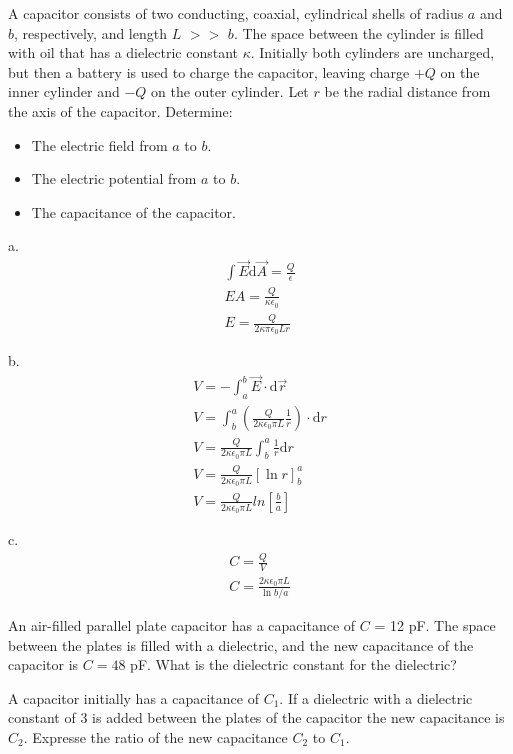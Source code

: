 \documentclass[../em.tex]{subfiles}
\begin{document}
\pagebreak
\begin{example}
    A capacitor consists of two conducting, coaxial, cylindrical shells of radius $a$ and $b$, respectively,
    and length $L$ $>>$ $b$. The space between the cylinder is filled with oil that has a dielectric constant $\kappa$.
    Initially both cylinders are uncharged, but then a battery is used to charge the capacitor, leaving charge $+Q$ 
    on the inner cylinder and $-Q$ on the outer cylinder. Let $r$ be the radial distance from the axis of the capacitor.
    Determine:
    \begin{itemize}
        \item The electric field from $a$ to $b$.
        \item The electric potential from $a$ to $b$.
        \item The capacitance of the capacitor.
    \end{itemize}

    a.
    \begin{align*}
        \int \vec{E}\mathrm{d}\vec{A}=\frac{Q}{\epsilon}\\ 
        EA = \frac{Q}{\kappa\epsilon_0}\\
        E = \frac{Q}{2\kappa \pi\epsilon_0 L r}
    \end{align*} 

    b.
    \begin{align*}
        V = -\int_a^b \vec{E}\cdot\mathrm{d}\vec{r}\\
        V = \int^a_b \left(\frac{Q}{2\kappa\epsilon_0 \pi L}\frac{1}{r}\right)\cdot \mathrm{d}r\\
        V = \frac{Q}{2\kappa\epsilon_0\pi L}\int_b^a \frac{1}{r}\mathrm{d}r\\
        V = \frac{Q}{2\kappa\epsilon_0\pi L}[\ln r]^a_b \\
        V = \frac{Q}{2\kappa\epsilon_0\pi L}ln\left[\frac{b}{a}\right]
    \end{align*}

    c.
    \begin{align*}
        C = \frac{Q}{V}\\
        C = \frac{2\kappa \epsilon_0 \pi L}{\ln b/a}
    \end{align*}

\end{example}
\ex An air-filled parallel plate capacitor has a capacitance of $C$ = 12 pF. The space between the plates is filled with a dielectric, and the new capacitance of the capacitor is $C=48$ pF. What is the dielectric constant for the dielectric?

\ex A capacitor initially has a capacitance of $C_1$. If a dielectric with a dielectric constant of 3 is added between the plates of the capacitor the new 
capacitance is $C_2$. Expresse the ratio of the new capacitance $C_2$ to $C_1$.
\end{document}
